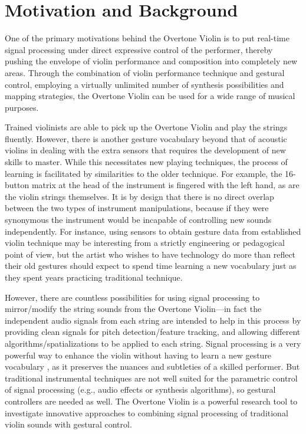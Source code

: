 \section{Motivation and Background}

One of the primary motivations behind the Overtone Violin is to put real-time
signal processing under direct expressive control of the performer, thereby
pushing the envelope of violin performance and composition into completely new
areas. Through the combination of violin performance technique and gestural
control, employing a virtually unlimited number of synthesis possibilities and
mapping strategies, the Overtone Violin can be used for a wide range of musical
purposes.

Trained violinists are able to pick up the Overtone Violin and play the strings
fluently. However, there is another gesture vocabulary beyond that of acoustic
violins in dealing with the extra sensors that requires the development of new
skills to master. While this necessitates new playing techniques, the process of
learning is facilitated by similarities to the older technique. For example, the
16-button matrix at the head of the instrument is fingered with the left hand, as
are the violin strings themselves. It is by design that there is no direct
overlap between the two types of instrument manipulations, because if they were
synonymous the instrument would be incapable of controlling new sounds
independently. For instance, using sensors to obtain gesture data from
established violin technique may be interesting from a strictly engineering or
pedagogical point of view, but the artist who wishes to have technology do more
than reflect their old gestures should expect to spend time learning a new
vocabulary just as they spent years practicing traditional technique.

However, there are countless possibilities for using signal processing to
mirror/modify the string sounds from the Overtone Violin---in fact the
independent audio signals from each string are intended to help in this process
by providing clean signals for pitch detection/feature tracking, and allowing
different algorithms/spatializations to be applied to each string. Signal
processing is a very powerful way to enhance the violin without having to learn a
new gesture vocabulary \cite{Jehan:2001b,Poepel:2004}, as it preserves the nuances and subtleties of a
skilled performer. But traditional instrumental techniques are not well suited
for the parametric control of signal processing (e.g., audio effects or synthesis
algorithms), so gestural controllers are needed as well. The Overtone Violin is a
powerful research tool to investigate innovative approaches to combining signal
processing of traditional violin sounds with gestural control.

